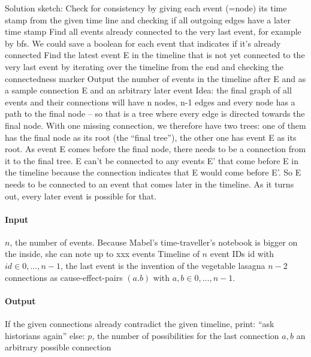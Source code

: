 Solution sketch:
Check for consistency by giving each event (=node) its time stamp from the given time line and checking if all outgoing edges have a later time stamp
Find all events already connected to the very last event, for example by bfs. We could save a boolean for each event that indicates if it’s already connected
Find the latest event E in the timeline that is not yet connected to the very last event by iterating over the timeline from the end and checking the connectedness marker
Output the number of events in the timeline after E and as a sample connection E and an arbitrary later event
Idea: the final graph of all events and their connections will have n nodes, n-1 edges and every node has a path to the final node – so that is a tree where every edge is directed towards the final node. With one missing connection, we therefore have two trees: one of them has the final node as its root (the “final tree”), the other one has event E as its root. As event E comes before the final node, there needs to be a connection from it to the final tree. E can’t be connected to any events E’ that come before E in the timeline because the connection indicates that E would come before E’. So E needs to be connected to an event that comes later in the timeline. As it turns out, every later event is possible for that.

\paragraph*{Input}

$n$, the number of events. Because Mabel's time-traveller’s notebook is bigger on the inside, she can note up to xxx events
Timeline of $n$ event IDs id with $id \in {0,...,n-1}$, the last event is the invention of the vegetable lasagna
$n-2$ connections as cause-effect-pairs $(a.b)$ with $a,b \in {0,...,n-1}$.

\paragraph*{Output}

If the given connections already contradict the given timeline, print: “ask historians again”
else:
$p$, the number of possibilities for the last connection
$a, b$ an arbitrary possible connection

\begin{samples}
\end{samples}

